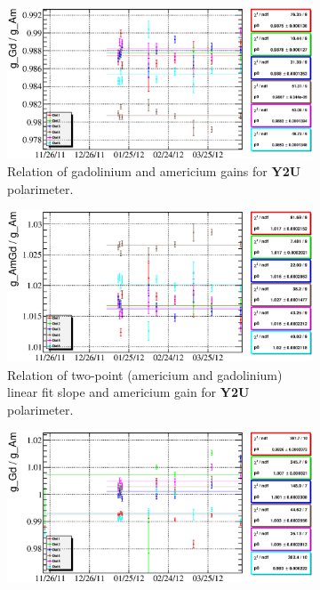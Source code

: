 \documentclass[a4paper,12pt]{article}
\begin{document}
\begin{figure}[htb]
\begin{subfigure}[t]{0.49\textwidth}
\includegraphics[width=\textwidth]{gfx/run12_alpha/Y2U/c_chGdGain_over_AmGain_by_day_Y2U.eps}
\caption{Relation of gadolinium and americium gains for \textbf{Y2U} polarimeter.}
\end{subfigure}
%
\hfill
%
\begin{subfigure}[t]{0.49\textwidth}
\includegraphics[width=\textwidth]{gfx/run12_alpha/Y2U/c_chAmGdGain_over_AmGain_by_day_Y2U.eps}
\caption{Relation of two-point (americium and gadolinium) linear fit slope and americium gain
for \textbf{Y2U} polarimeter.}
\end{subfigure}
%
\begin{subfigure}[t]{0.49\textwidth}
\includegraphics[width=\textwidth]{gfx/run12_alpha/B2D/c_chGdGain_over_AmGain_by_day_B2D.eps}

\end{subfigure}
\end{figure}
\end{document}
